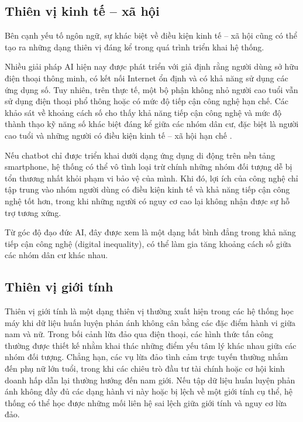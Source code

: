 \subsection{Thiên vị kinh tế – xã hội}
Bên cạnh yếu tố ngôn ngữ, sự khác biệt về điều kiện kinh tế – xã hội cũng có thể tạo ra những dạng thiên vị đáng kể trong quá trình triển khai hệ thống.

Nhiều giải pháp AI hiện nay được phát triển với giả định rằng người dùng sở hữu điện thoại thông minh, có kết nối Internet ổn định và có khả năng sử dụng các ứng dụng số. Tuy nhiên, trên thực tế, một bộ phận không nhỏ người cao tuổi vẫn sử dụng điện thoại phổ thông hoặc có mức độ tiếp cận công nghệ hạn chế. Các khảo sát về khoảng cách số cho thấy khả năng tiếp cận công nghệ và mức độ thành thạo kỹ năng số khác biệt đáng kể giữa các nhóm dân cư, đặc biệt là người cao tuổi và những người có điều kiện kinh tế – xã hội hạn chế \cite{charness2022_digitaldivide, friemel2016_digitaldivide}.

Nếu chatbot chỉ được triển khai dưới dạng ứng dụng di động trên nền tảng smartphone, hệ thống có thể vô tình loại trừ chính những nhóm đối tượng dễ bị tổn thương nhất khỏi phạm vi bảo vệ của mình. Khi đó, lợi ích của công nghệ chỉ tập trung vào nhóm người dùng có điều kiện kinh tế và khả năng tiếp cận công nghệ tốt hơn, trong khi những người có nguy cơ cao lại không nhận được sự hỗ trợ tương xứng.

Từ góc độ đạo đức AI, đây được xem là một dạng bất bình đẳng trong khả năng tiếp cận công nghệ (digital inequality), có thể làm gia tăng khoảng cách số giữa các nhóm dân cư khác nhau.

\subsection{Thiên vị giới tính}
Thiên vị giới tính là một dạng thiên vị thường xuất hiện trong các hệ thống học máy khi dữ liệu huấn luyện phản ánh không cân bằng các đặc điểm hành vi giữa nam và nữ.
Trong bối cảnh lừa đảo qua điện thoại, các hình thức tấn công thường được thiết kế nhằm khai thác những điểm yếu tâm lý khác nhau giữa các nhóm đối tượng. Chẳng hạn, các vụ lừa đảo tình cảm trực tuyến thường nhắm đến phụ nữ lớn tuổi, trong khi các chiêu trò đầu tư tài chính hoặc cơ hội kinh doanh hấp dẫn lại thường hướng đến nam giới. Nếu tập dữ liệu huấn luyện phản ánh không đầy đủ các dạng hành vi này hoặc bị lệch về một giới tính cụ thể, hệ thống có thể học được những mối liên hệ sai lệch giữa giới tính và nguy cơ lừa đảo.

